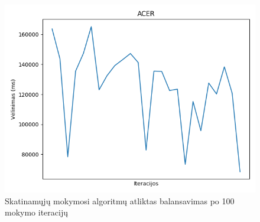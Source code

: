 \documentclass{VUMIFPSbakalaurinis}
\begin{document}
\begin{figure}[H]
\begin{minipage}[b]{0.4\textwidth}
        \includegraphics[width=\textwidth]{img/acer_100.png}
    \end{minipage}
    \caption{Skatinamųjų mokymosi algoritmų atliktas balansavimas po 100 mokymo iteracijų}
\end{figure}
\end{document}
